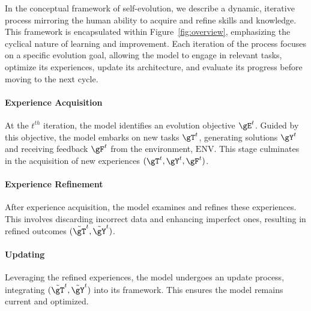 \documentclass[sn-basic, Numbered]{sn-jnl}%
\theoremstyle{thmstyleone}%
\theoremstyle{thmstyletwo}%
\theoremstyle{thmstylethree}%
\begin{document}

In the conceptual framework of self-evolution, we describe a dynamic, iterative process mirroring the human ability to acquire and refine skills and knowledge. This framework is encapsulated within Figure~\ref{fig:overview}, emphasizing the cyclical nature of learning and improvement. Each iteration of the process focuses on a specific evolution goal, allowing the model to engage in relevant tasks, optimize its experiences, update its architecture, and evaluate its progress before moving to the next cycle.

\noindent\paragraph{Experience Acquisition}
At the $t^{th}$ iteration, the model identifies an evolution objective $\gE^{t}$. Guided by this objective, the model embarks on new tasks $\gT^{t}$, generating solutions $\gY^{t}$ and receiving feedback $\gF^{t}$ from the environment, $\mathrm{ENV}$. This stage culminates in the acquisition of new experiences ${(\gT^{t}, \gY^{t}, \gF^{t})}$.

\noindent\paragraph{Experience Refinement}
After experience acquisition, the model examines and refines these experiences. This involves discarding incorrect data and enhancing imperfect ones, resulting in refined outcomes ${(\Tilde{\gT}^{t}, \Tilde{\gY}^{t})}$.



\noindent\paragraph{Updating}
Leveraging the refined experiences, the model undergoes an update process, integrating ${(\Tilde{\gT}^{t}, \Tilde{\gY}^{t})}$ into its framework. This ensures the model remains current and optimized.
\end{document}
